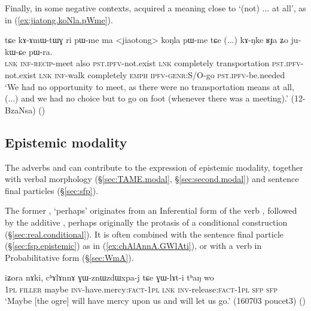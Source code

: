 Finally, in some negative contexts,  acquired a meaning close to  `(not) ... at all', as in (\ref{ex:jiatong.koNla.pWme}).

\begin{exe}
\ex \label{ex:jiatong.koNla.pWme}
\gll  tɕe kɤ-ɤmɯ-tɯɣ ri pɯ-me ma <jiaotong> koŋla pɯ-me tɕe (...) kɤ-ŋke ʁɟa ʑo ju-kɯ-ɕe pɯ-ra.  \\
\textsc{lnk} \textsc{inf}-\textsc{recip}-meet also \textsc{pst}.\textsc{ipfv}-not.exist \textsc{lnk} completely transportation \textsc{pst}.\textsc{ipfv}-not.exist \textsc{lnk} { } \textsc{inf}-walk completely \textsc{emph} \textsc{ipfv}-\textsc{genr}:S/O-go \textsc{pst}.\textsc{ipfv}-be.needed \\
\glt `We had no opportunity to meet, as there were no transportation means at all, (...) and we had no choice but to go on foot (whenever there was a meeting).' (12-BzaNsa)
()
\end{exe} 


 \subsection{Epistemic modality}\label{sec:modality.adverbs}
 The adverbs  and   can contribute to the expression of epistemic modality, together with verbal morphology (§\ref{sec:TAME.modal}, §\ref{sec:second.modal}) and sentence final particles (§\ref{sec:sfp}).
 
 The former , `perhaps' originates from an Inferential form of the verb , followed by the additive , perhaps originally the protasis of a conditional construction (§\ref{sec:real.conditional}). It is often combined with the sentence final particle  (§\ref{sec:fsp.epistemic}) as in (\ref{ex:chAlAnnA.GWlAti}), or with a  verb in Probabilitative form (§\ref{sec:WmA}).
 
 \begin{exe}
\ex \label{ex:chAlAnnA.GWlAti}
\gll iʑora nɤki, cʰɤlɤnnɤ ɣɯ-znɯzdɯxpa-j tɕe ɣɯ-lɤt-i tʰaŋ wo \\
\textsc{1pl} \textsc{filler} maybe \textsc{inv}-have.mercy:\textsc{fact}-\textsc{1pl} \textsc{lnk} \textsc{inv}-release:\textsc{fact}-\textsc{1pl} \textsc{sfp} \textsc{sfp} \\
\glt `Maybe [the ogre] will have mercy upon us and will let us go.' (160703 poucet3)
()
 \end{exe} 
 
